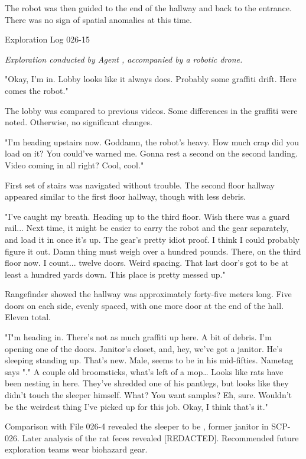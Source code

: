 The robot was then guided to the end of the hallway and back to the entrance. There was no sign of spatial anomalies at this time.
\bigskip
\begin{flushleft}
Exploration Log 026-15
\end{flushleft}
\textsl{Exploration conducted by Agent , accompanied by a robotic drone.}

"Okay, I'm in. Lobby looks like it always does. Probably some graffiti drift. Here comes the robot."

The lobby was compared to previous videos. Some differences in the graffiti were noted. Otherwise, no significant changes.

"I'm heading upstairs now. Goddamn, the robot's heavy. How much crap did you load on it? You could've warned me. Gonna rest a second on the second landing. Video coming in all right? Cool, cool."

First set of stairs was navigated without trouble. The second floor hallway appeared similar to the first floor hallway, though with less debris.

"I've caught my breath. Heading up to the third floor. Wish there was a guard rail... Next time, it might be easier to carry the robot and the gear separately, and load it in once it's up. The gear's pretty idiot proof. I think I could probably figure it out. Damn thing must weigh over a hundred pounds. There, on the third floor now. I count... twelve doors. Weird spacing. That last door's got to be at least a hundred yards down. This place is pretty messed up."

Rangefinder showed the hallway was approximately forty-five meters long. Five doors on each side, evenly spaced, with one more door at the end of the hall. Eleven total.

"I"m heading in. There's not as much graffiti up here. A bit of debris. I'm opening one of the doors. Janitor's closet, and, hey, we've got a janitor. He's sleeping standing up. That's new. Male, seems to be in his mid-fifties. Nametag says "." A couple old broomsticks, what's left of a mop… Looks like rats have been nesting in here. They've shredded one of his pantlegs, but looks like they didn't touch the sleeper himself. What? You want samples? Eh, sure. Wouldn't be the weirdest thing I've picked up for this job. Okay, I think that's it."

Comparison with File 026-4 revealed the sleeper to be  , former janitor in SCP-026. Later analysis of the rat feces \linebreak revealed [REDACTED]. Recommended future exploration teams wear biohazard gear.


